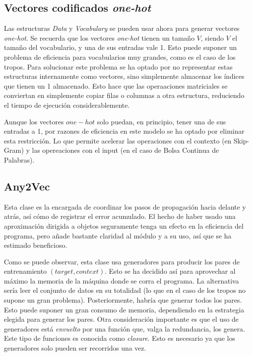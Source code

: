 \subsection{Vectores codificados \textit{one-hot}}

Las estructuras \textit{Data} y \textit{Vocabulary} se pueden usar ahora para generar vectores \textit{one-hot}. Se recuerda que los vectores \textit{one-hot} tienen un tamaño $V$, siendo $V$ el tamaño del vocabulario, y
una de sus entradas vale 1. Esto puede suponer un problema de eficiencia para vocabularios muy grandes, como es el caso de los tropos. Para solucionar este problema se ha optado por no representar
estas estructuras internamente como vectores, sino simplemente almacenar los índices que tienen un 1 almacenado. Esto hace que las operaaciones matriciales se conviertan en simplemente copiar filas o columnas a otra estructura, reduciendo el tiempo de ejecución considerablemente.

Aunque los vectores $one-hot$ solo puedan, en principio, tener una de sus entradas a 1, por razones de eficiencia en este modelo se ha optado por eliminar esta restricción. Lo que permite acelerar
las operaciones con el contexto (en Skip-Gram) y las opereaciones con el input (en el caso de Bolsa Continua de Palabras).

\subsection{Any2Vec}

Esta clase es la encargada de coordinar los pasos de propagación hacia delante y atrás, así cómo de registrar el error acumulado. El hecho de haber usado una aproximación dirigida a objetos
seguramente tenga un efecto en la eficiencia del programa, pero añade bastante claridad al módulo y a su uso, así que se ha estimado beneficioso.

Como se puede observar, esta clase usa generadores para producir los pares de entrenamiento $(target, context)$. Esto se ha decidido así para aprovechar al máximo la memoria de la máquina donde
se corra el programa. La alternativa sería leer el conjunto de datos en su totalidad (lo que en el caso de los tropos no supone un gran problema). Posteriormente, habría que generar todos los pares.
Esto puede suponer un gran consumo de memoria, dependiendo en la estrategia elegida para generar los pares. Otra consideración importante es que el uso de generadores está \textit{envuelto} por una
función que, valga la redundancia, los genera. Este tipo de funciones es conocida como \textit{closure}. Esto es necesario ya que los generadores solo pueden ser recorridos una vez.

